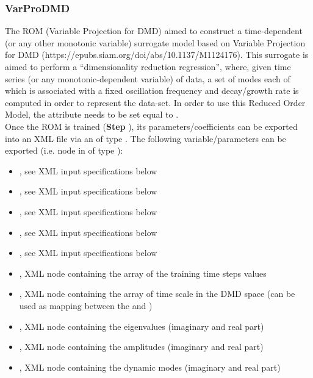 \subsubsection{VarProDMD}
  The  ROM (Variable Projection for DMD) aimed to construct a time-dependent
  (or any other monotonic     variable) surrogate model based on Variable Projection for DMD
  (https://epubs.siam.org/doi/abs/10.1137/M1124176).     This surrogate is aimed to perform a
  ``dimensionality reduction regression'', where, given time     series (or any monotonic-dependent
  variable) of data, a set of modes each of which is associated     with a fixed oscillation
  frequency and decay/growth rate is computed     in order to represent the data-set.     In order
  to use this Reduced Order Model, the  attribute      needs to be set
  equal to .     \\     Once the ROM  is trained (\textbf{Step}
  ), its parameters/coefficients can be exported into an XML file     via an
   of type . The following variable/parameters  can be exported
  (i.e.  node     in  of type ):     \begin{itemize}
  \item {}, see XML input specifications below       \item {}, see XML
  input specifications below       \item {}, see XML input specifications below
  \item {}, see XML input specifications below       \item {},
  see XML input specifications below       \item {}, XML node containing the array
  of the training time steps values       \item {}, XML node containing the
  array of time scale in the DMD space (can be used as mapping       between the
   and )       \item {}, XML node containing
  the eigenvalues (imaginary and real part)       \item {}, XML node containing
  the amplitudes (imaginary and real part)       \item {}, XML node containing the
  dynamic modes (imaginary and real part)     \end{itemize}

